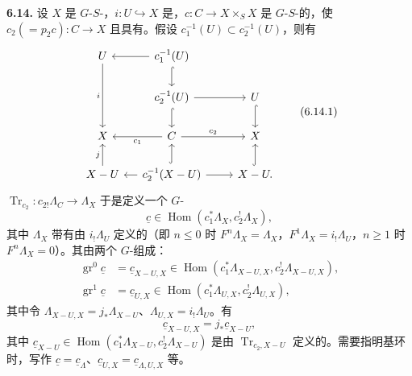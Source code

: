 \textbf{6.14.} 设 $X$ 是 $G$-$S$-，$i:U\hookrightarrow X$ 是，$c:C\to X\times_SX$ 是 $G$-$S$-的，使 $c_2(=p_2c):C\to X$ 且具有。假设 $c_1^{-1}(U)\subset c_2^{-1}(U)$，则有
\begin{equation}\begin{tikzcd}[column sep=small]
U\arrow[dd,"i"']&c_1^{-1}(U)\arrow[l]\arrow[d,hook]&&\\
&c_2^{-1}(U)\arrow[d,hook]\arrow[rr]&&U\arrow[d,hook]\\
X&C\arrow[l,"c_1"]\arrow[rr,"c_2"]&&X\\
X-U\arrow[u,"j"]&c_2^{-1}(X-U)\arrow[l]\arrow[u,hook]\arrow[rr]&&X-U\arrow[u,hook].
\end{tikzcd}\tag{6.14.1}\end{equation}
 $\operatorname{Tr}_{c_2}:c_{2!}\Lambda_C\to\Lambda_X$ 于是定义一个 $G$-
\begin{equation}\underline c\in\operatorname{Hom}(c_1^*\Lambda_X,c_2^!\Lambda_X),\tag{6.14.2}\end{equation}
其中 $\Lambda_X$ 带有由 $i_!\Lambda_U$ 定义的（即 $n\le0$ 时 $F^n\Lambda_X=\Lambda_X$，$F^1\Lambda_X=i_!\Lambda_U$，$n\ge1$ 时 $F^n\Lambda_X=0$）。其由两个 $G$-组成：
\begin{equation}\begin{aligned}
\operatorname{gr}^0\underline c&=\underline c_{X-U,X}\in\operatorname{Hom}(c_1^*\Lambda_{X-U,X},c_2^!\Lambda_{X-U,X}),\\
\operatorname{gr}^1\underline c&=\underline c_{U,X}\in\operatorname{Hom}(c_1^*\Lambda_{U,X},c_2^!\Lambda_{U,X}),
\end{aligned}\tag{6.14.3}\end{equation}
其中令 $\Lambda_{X-U,X}=j_*\Lambda_{X-U}$、$\Lambda_{U,X}=i_!\Lambda_U$。有
\begin{equation}\underline c_{X-U,X}=j_*\underline c_{X-U},\tag{6.14.4}\end{equation}
其中 $\underline c_{X-U}\in\operatorname{Hom}(c_1^*\Lambda_{X-U},c_2^!\Lambda_{X-U})$ 是由 $\operatorname{Tr}_{c_2,X-U}$ 定义的。需要指明基环时，写作 $\underline c=\underline c_\Lambda$、$\underline c_{U,X}=\underline c_{\Lambda,U,X}$ 等。

